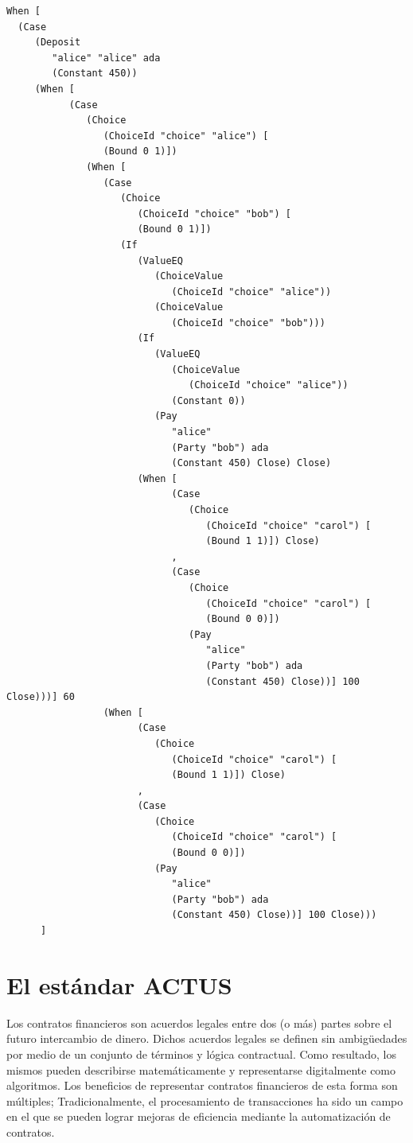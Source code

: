 \documentclass[12pt]{book}
\begin{document}
\begin{lstlisting}[style=Haskell-cardano, language=Marlowe, caption=Contrato \textit{Escrow} completamente expandido.]
When [
  (Case
     (Deposit
        "alice" "alice" ada
        (Constant 450))
     (When [
           (Case
              (Choice
                 (ChoiceId "choice" "alice") [
                 (Bound 0 1)])
              (When [
                 (Case
                    (Choice
                       (ChoiceId "choice" "bob") [
                       (Bound 0 1)])
                    (If
                       (ValueEQ
                          (ChoiceValue
                             (ChoiceId "choice" "alice"))
                          (ChoiceValue
                             (ChoiceId "choice" "bob")))
                       (If
                          (ValueEQ
                             (ChoiceValue
                                (ChoiceId "choice" "alice"))
                             (Constant 0))
                          (Pay
                             "alice"
                             (Party "bob") ada
                             (Constant 450) Close) Close)
                       (When [
                             (Case
                                (Choice
                                   (ChoiceId "choice" "carol") [
                                   (Bound 1 1)]) Close)
                             ,
                             (Case
                                (Choice
                                   (ChoiceId "choice" "carol") [
                                   (Bound 0 0)])
                                (Pay
                                   "alice"
                                   (Party "bob") ada
                                   (Constant 450) Close))] 100 Close)))] 60
                 (When [
                       (Case
                          (Choice
                             (ChoiceId "choice" "carol") [
                             (Bound 1 1)]) Close)
                       ,
                       (Case
                          (Choice
                             (ChoiceId "choice" "carol") [
                             (Bound 0 0)])
                          (Pay
                             "alice"
                             (Party "bob") ada
                             (Constant 450) Close))] 100 Close)))
      ]
\end{lstlisting}

\section{El estándar ACTUS}
Los contratos financieros son acuerdos legales entre dos (o más) partes sobre el futuro intercambio de dinero. Dichos acuerdos legales se definen sin ambigüedades por medio de un conjunto de términos y lógica contractual. Como resultado, los mismos pueden describirse matemáticamente y representarse digitalmente como algoritmos. Los beneficios de representar contratos financieros de esta forma son múltiples; Tradicionalmente, el procesamiento de transacciones ha sido un campo en el que se pueden lograr mejoras de eficiencia mediante la automatización de contratos.
\end{document}
